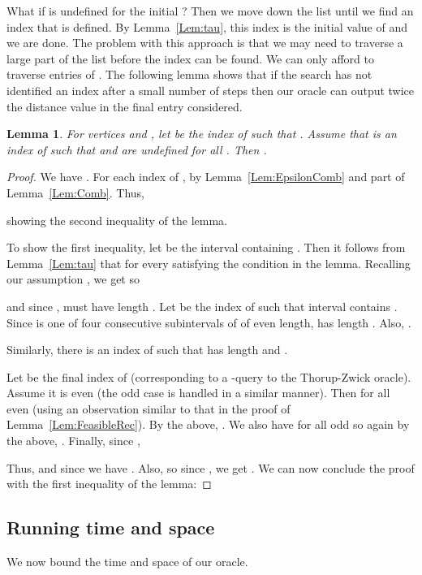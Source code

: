 \documentclass[11pt]{article}
\newtheorem{Lem}{Lemma}
\begin{document}
What if  is undefined for the initial ? Then we move down the list 
until we find an index  that is defined. By Lemma~\ref{Lem:tau}, this index is the initial
value of  and we are done. The problem with this approach is that we may need to traverse a large part
of the list before the index can be found. We can only afford to traverse 
entries of . The following lemma shows that if the search has
not identified an index  after a small number of steps then our oracle can output twice the distance value
in the final entry considered.
\begin{Lem}\label{Lem:NoPointer}
For vertices  and , let  be the index of  such that
.
Assume that  is an index of  such that
 and  are undefined for all .
Then .
\end{Lem}
\begin{proof}
We have .
For each index  of ,  by
Lemma~\ref{Lem:EpsilonComb} and part  of Lemma~\ref{Lem:Comb}. Thus,

showing the second inequality of the lemma.

To show the first inequality, let  be the interval containing . Then it follows from
Lemma~\ref{Lem:tau} that  for every  satisfying the condition in the lemma.
Recalling our assumption , we get
 so

and since ,
 must have length . Let  be the index of  such that
interval  contains
. Since  is one of four consecutive subintervals of  of even length,  has length .
Also, .

Similarly, there is an index  of  such that
 has length
 and .



Let  be the final index of  (corresponding to a -query to the Thorup-Zwick oracle). Assume it is even
(the odd case is handled in a similar manner). Then
 for all even  (using an observation similar to that in
the proof of Lemma~\ref{Lem:FeasibleRec}). By the above,
. We also have
 for all odd  so again by the above,
. Finally, since ,

Thus,  and since  we have . Also,
 so since , we get .
We can now conclude the proof with the first inequality of the lemma:

\end{proof}

\subsection{Running time and space}\label{subsec:TimeSpace}
We now bound the time and space of our oracle.
\end{document}

